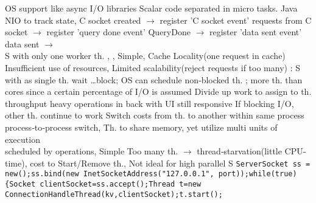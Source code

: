 OS support like async I/O libraries
Scalar code separated in micro tasks.
Java NIO to track state,
C socket created
$\rightarrow$
register 'C socket event'
\textbar
requests from C socket
$\rightarrow$
register 'query done event'
\textbar
QueryDone
$\rightarrow$
register 'data sent event'
\textbar
data sent
$\rightarrow$
%
%
\\
S with only one worker th.
,
,
\btext{++:}
Simple, 
Cache Locality(one request in cache)
\btext{--:}
Insufficient use of resources, 
Limited scalability(reject requests if too many)
:
S with 
as single th. wait \dots block;
OS can schedule non‐blocked th.
;
more th. than cores since a certain percentage of I/O is assumed
\btext{++:}
Divide up work to assign to th.
throughput
heavy operations in back with UI still responsive
If blocking I/O, other th. continue to work
Switch costs from th. to another within same process 
process‐to‐process switch,
Th. to share memory, yet utilize multi units of execution
\\
scheduled by operations,
\btext{++:}
Simple 
\btext{--:}
Too many th.
$\rightarrow$
thread‐starvation(little CPU‐time),
cost to Start/Remove th., 
Not ideal for high parallel S
\lstinline{ServerSocket ss = new();ss.bind(new InetSocketAddress("127.0.0.1", port));while(true){Socket clientSocket=ss.accept();Thread t=new ConnectionHandleThread(kv,clientSocket);t.start();}
\btext{+++}
